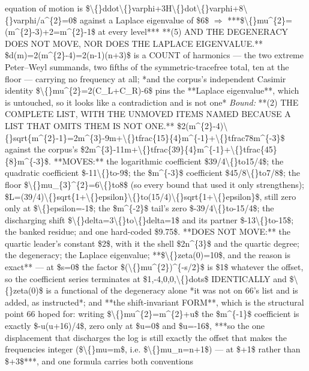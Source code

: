 \begin{description}
equation of motion is \$\textbackslash\{\}ddot\textbackslash\{\}varphi+3H\textbackslash\{\}dot\textbackslash\{\}varphi+8\textbackslash\{\}varphi/a\textasciicircum{}\{2\}=0\$ against a Laplace eigenvalue of \$6\$ \ensuremath{\Rightarrow} ***\$\textbackslash\{\}mu\textasciicircum{}\{2\}=(m\textasciicircum{}\{2\}-3)+2=m\textasciicircum{}\{2\}-1\$ at every level***  **(5) AND THE DEGENERACY DOES NOT MOVE, NOR DOES THE LAPLACE EIGENVALUE.** \$d(m)=2(m\textasciicircum{}\{2\}-4)=2(n-1)(n+3)\$ is a COUNT of harmonics --- the two extreme Peter--Weyl summands, two fifths of the symmetric-tracefree total, ten at the floor --- carrying no frequency at all; *and the corpus's independent Casimir identity \$\textbackslash\{\}mu\textasciicircum{}\{2\}=2(C\_L+C\_R)-6\$ pins the **Laplace eigenvalue**, which is untouched, so it looks like a contradiction and is not one*
 \emph{Bound:} **(2) THE COMPLETE LIST, WITH THE UNMOVED ITEMS NAMED BECAUSE A LIST THAT OMITS THEM IS NOT ONE.** \$2(m\textasciicircum{}\{2\}-4)\textbackslash\{\}sqrt\{m\textasciicircum{}\{2\}-1\}=2m\textasciicircum{}\{3\}-9m+\textbackslash\{\}tfrac\{15\}\{4\}m\textasciicircum{}\{-1\}+\textbackslash\{\}tfrac78m\textasciicircum{}\{-3\}\$ against the corpus's \$2m\textasciicircum{}\{3\}-11m+\textbackslash\{\}tfrac\{39\}\{4\}m\textasciicircum{}\{-1\}+\textbackslash\{\}tfrac\{45\}\{8\}m\textasciicircum{}\{-3\}\$. **MOVES:** the logarithmic coefficient \$39/4\textbackslash\{\}to15/4\$; the quadratic coefficient \$-11\textbackslash\{\}to-9\$; the \$m\textasciicircum{}\{-3\}\$ coefficient \$45/8\textbackslash\{\}to7/8\$; the floor \$\textbackslash\{\}mu\_\{3\}\textasciicircum{}\{2\}=6\textbackslash\{\}to8\$ (so every bound that used it only strengthens); \$L=(39/4)\textbackslash\{\}sqrt\{1+\textbackslash\{\}epsilon\}\textbackslash\{\}to(15/4)\textbackslash\{\}sqrt\{1+\textbackslash\{\}epsilon\}\$, still zero only at \$\textbackslash\{\}epsilon=-1\$; the \$m\textasciicircum{}\{-2\}\$ tail's zero \$-39/4\textbackslash\{\}to-15/4\$; the discharging shift \$\textbackslash\{\}delta=3\textbackslash\{\}to\textbackslash\{\}delta=1\$ and its partner \$-13\textbackslash\{\}to-15\$; the banked residue; and one hard-coded \$9.75\$. **DOES NOT MOVE:** the quartic leader's constant \$2\$, with it the shell \$2n\textasciicircum{}\{3\}\$ and the quartic degree; the degeneracy; the Laplace eigenvalue;  **\$\textbackslash\{\}zeta(0)=10\$, and the reason is exact** --- at \$s=0\$ the factor \$(\textbackslash\{\}mu\textasciicircum{}\{2\})\textasciicircum{}\{-s/2\}\$ is \$1\$ whatever the offset, so the coefficient series terminates at \$1,-4,0,0,\textbackslash\{\}dots\$ IDENTICALLY and \$\textbackslash\{\}zeta(0)\$ is a functional of the degeneracy alone  *it was not on 66's list and is added, as instructed*; and  **the shift-invariant FORM**, which is the structural point 66 hoped for: writing \$\textbackslash\{\}mu\textasciicircum{}\{2\}=m\textasciicircum{}\{2\}+u\$ the \$m\textasciicircum{}\{-1\}\$ coefficient is exactly \$-u(u+16)/4\$, zero only at \$u=0\$ and \$u=-16\$, ***so the one displacement that discharges the log is still exactly the offset that makes the frequencies integer (\$\textbackslash\{\}mu=m\$, i.e. \$\textbackslash\{\}mu\_n=n+1\$) --- at \$+1\$ rather than \$+3\$***, and one formula carries both conventions  
\end{description}
